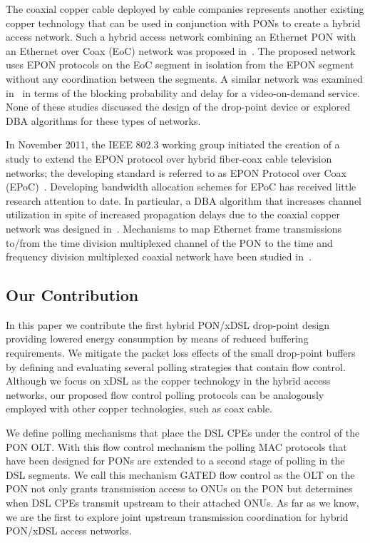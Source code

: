 \documentclass[pdftex,journal]{IEEEtran}
\begin{document}
The coaxial copper cable deployed by cable companies represents another existing
copper technology that can be used in conjunction with PONs to create
a hybrid access network.
Such a hybrid access network combining an Ethernet PON with an Ethernet over
Coax (EoC) network was proposed in~\cite{WLZZC0909}.
The proposed network uses EPON protocols on the EoC
segment in isolation from the EPON segment without any coordination between
the segments. A similar network was examined in~\cite{W1009} in terms of
the blocking probability and delay for a video-on-demand
service. None of these studies discussed the design of the drop-point device
or explored DBA algorithms for these types of networks.

In November 2011, the IEEE 802.3 working group initiated the creation of
a study to extend the EPON protocol over hybrid fiber-coax cable television
networks; the developing standard is referred to as EPON Protocol over Coax
(EPoC)~\cite{BTMZCEF1013}. Developing bandwidth allocation schemes for
EPoC has received  little research attention to date.
In particular, a DBA algorithm that increases
channel utilization in spite of increased propagation delays due to
the coaxial copper network was designed in~\cite{BTZCEFM0413}.
Mechanisms to map Ethernet frame transmissions to/from
the time division multiplexed channel of the PON to the time and frequency
division multiplexed coaxial network have been studied
in~\cite{BTMZCEF1013,BTZCEFM1014}.


\subsection{Our Contribution}
In this paper we contribute the first hybrid PON/xDSL drop-point design
providing lowered
energy consumption by means of reduced buffering requirements. We
mitigate the packet loss effects of the small drop-point buffers by defining
and evaluating several polling strategies that contain flow control.
Although we focus on xDSL as the copper technology in the hybrid
access networks, our proposed flow control polling protocols can be
analogously employed with other copper technologies, such as coax cable.

We define polling mechanisms that place the DSL CPEs under the control
of the PON OLT. With this flow control mechanism the polling MAC protocols that
have been designed for PONs are extended to a second stage of polling in the DSL
segments. We call this mechanism GATED flow control as the OLT on the
PON not only grants transmission access to ONUs on the PON but
determines when DSL CPEs transmit upstream to their attached ONUs. As
far as we know, we are the first to explore joint upstream transmission
coordination for hybrid PON/xDSL access networks.
\end{document}
